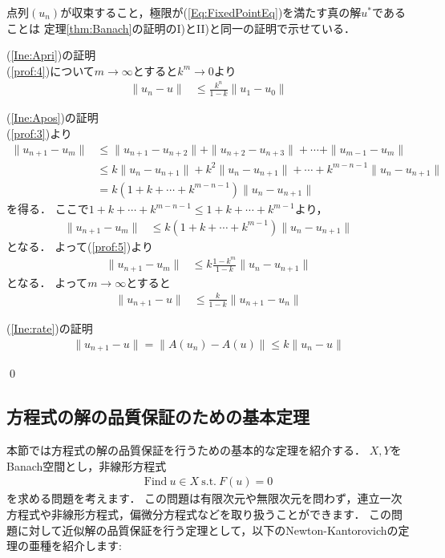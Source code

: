 \begin{Proof}[Banachの不動点定理の系]
点列$(u_n)$が収束すること，極限が(\ref{Eq:FixedPointEq})を満たす真の解$u^*$であることは
定理\ref{thm:Banach}の証明のI)とII)と同一の証明で示せている．

(\ref{Ine:Apri})の証明\\
(\ref{prof:4})について$m \rightarrow \infty$とすると$k^m \rightarrow 0$より
\begin{align*}
\| u_n - u \| &\le \frac{k^n}{1-k}  \| u_1 - u_0 \|
\end{align*}

(\ref{Ine:Apos})の証明\\
(\ref{prof:3})より
\begin{align*}
\| u_{n+1} - u_m \| &\le \| u_{n+1} - u_{n+2} \| + \| u_{n+2} - u_{n+3} \| + \cdots + \| u_{m-1} - u_m \|\\
&\le k \| u_n - u_{n+1} \| + k^2 \| u_n - u_{n+1} \| + \cdots + k^{m-n-1} \| u_n - u_{n+1} \| \\
&= k (1 + k + \cdots + k^{m-n-1}) \| u_n - u_{n+1} \|
\end{align*}
を得る．
ここで$1 + k + \cdots + k^{m-n-1} \le 1 + k + \cdots + k^{m-1}$より，
\begin{align*}
\| u_{n+1} - u_m \| &\le k  (1 + k + \cdots + k^{m-1}) \| u_n - u_{n+1} \|
\end{align*}
となる．
よって(\ref{prof:5})より
\begin{align*}
\| u_{n+1} - u_m \| &\le  k \frac{1-k^m}{1-k} \| u_n - u_{n+1} \|
\end{align*}
となる．
よって$m \rightarrow \infty$とすると
\begin{align*}
\| u_{n+1} - u \| &\le  \frac{k}{1-k} \| u_{n+1} - u_n  \|
\end{align*}

(\ref{Ine:rate})の証明\\
\begin{align*}
\| u_{n+1} - u \| = \| A(u_n) - A(u) \| \le k \| u_n - u \|
\end{align*}

\qed
\end{Proof}




\subsection{方程式の解の品質保証のための基本定理}\label{sec:define_Basic_theorem}
本節では方程式の解の品質保証を行うための基本的な定理を紹介する．
$X, Y$をBanach空間とし，非線形方程式
\begin{align*}
	\mbox{Find} ~ u \in X ~ \mbox{s.t.} ~ F(u) = 0
\end{align*}
を求める問題を考えます．
この問題は有限次元や無限次元を問わず，連立一次方程式や非線形方程式，偏微分方程式などを取り扱うことができます．
この問題に対して近似解の品質保証を行う定理として，以下のNewton-Kantorovichの定理の亜種を紹介します:


